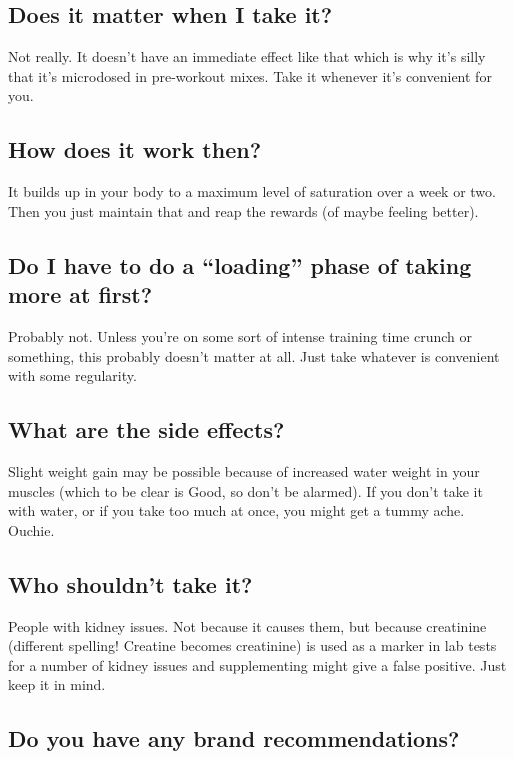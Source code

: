 \documentclass{article}
\begin{document}
\subsection{Does it matter when I take it?}

Not really. It doesn’t have an immediate effect like that which is why it’s silly that it’s microdosed in pre-workout mixes. Take it whenever it’s convenient for you.

\subsection{How does it work then?}

It builds up in your body to a maximum level of saturation over a week or two. Then you just maintain that and reap the rewards (of maybe feeling better).

\subsection{Do I have to do a “loading” phase of taking more at first?}

Probably not. Unless you’re on some sort of intense training time crunch or something, this probably doesn’t matter at all. Just take whatever is convenient with some regularity.

\subsection{What are the side effects?}

Slight weight gain may be possible because of increased water weight in your muscles (which to be clear is Good, so don't be alarmed). If you don’t take it with water, or if you take too much at once, you might get a tummy ache. Ouchie.

\subsection{Who shouldn’t take it?}

People with kidney issues. Not because it causes them, but because creatinine (different spelling! Creatine becomes creatinine) is used as a marker in lab tests for a number of kidney issues and supplementing might give a false positive. Just keep it in mind.

\subsection{Do you have any brand recommendations?}
\end{document}
